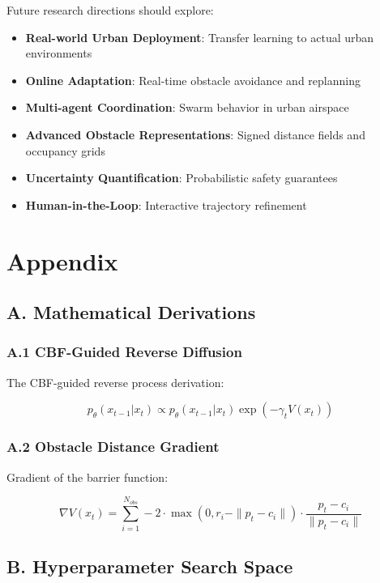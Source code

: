 \documentclass[12pt]{article}
\begin{document}
Future research directions should explore:

\begin{itemize}
    \item \textbf{Real-world Urban Deployment}: Transfer learning to actual urban environments
    \item \textbf{Online Adaptation}: Real-time obstacle avoidance and replanning
    \item \textbf{Multi-agent Coordination}: Swarm behavior in urban airspace
    \item \textbf{Advanced Obstacle Representations}: Signed distance fields and occupancy grids
    \item \textbf{Uncertainty Quantification}: Probabilistic safety guarantees
    \item \textbf{Human-in-the-Loop}: Interactive trajectory refinement
\end{itemize}

\section*{Appendix}

\subsection*{A. Mathematical Derivations}

\subsubsection*{A.1 CBF-Guided Reverse Diffusion}

The CBF-guided reverse process derivation:

\begin{equation}
p_\theta(x_{t-1}|x_t) \propto p_\theta(x_{t-1}|x_t) \exp(-\gamma_t V(x_t))
\end{equation}

\subsubsection*{A.2 Obstacle Distance Gradient}

Gradient of the barrier function:

\begin{equation}
\nabla V(x_t) = \sum_{i=1}^{N_{obs}} -2 \cdot \max(0, r_i - \|p_t - c_i\|) \cdot \frac{p_t - c_i}{\|p_t - c_i\|}
\end{equation}

\subsection*{B. Hyperparameter Search Space}
\end{document}
